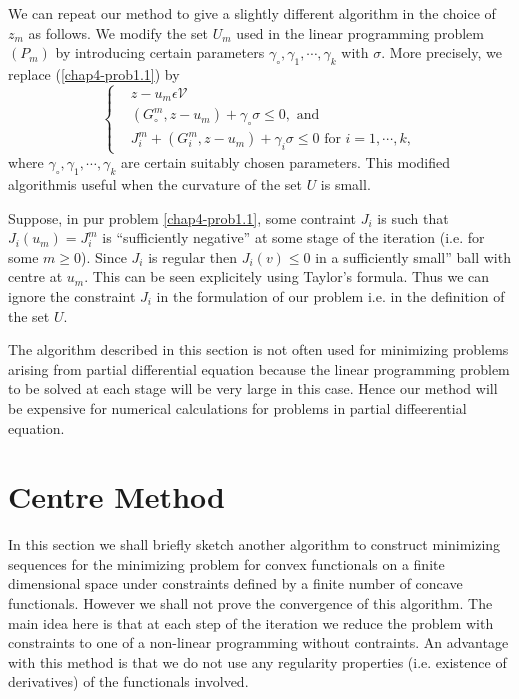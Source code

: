 \begin{remark}\label{chap4-rem1.3}
We can repeat our method to give a slightly different algorithm in the choice of $z_{m}$ as follows. We modify the set $U_{m}$ used in the linear programming problem $(P_{m})$ by introducing certain parameters $\gamma_{\circ}, \gamma_{1}, \cdots, \gamma_{k}$ with $\sigma$. More precisely, we replace (\ref{chap4-prob1.1}) by
\begin{equation*}
\begin{cases}
& z-u_{m} \epsilon \mathscr{V}\\
& (G_{\circ}^{m}, z-u_{m}) + \gamma_{\circ} \sigma \leq 0, \text{ and }\\
& J_{i}^{m} + (G_{i}^{m}, z-u_{m}) + \gamma_{i} \sigma \leq 0 \text{ for } i=1, \cdots , k,\tag*{$(1.1)'$}\label{chap4-eq1.1'}
\end{cases}
\end{equation*}
where $\gamma_{\circ}, \gamma_{1}, \cdots, \gamma_{k}$ are certain suitably chosen parameters. This modified algorithm\pageoriginale is useful when the curvature of the set $U$ is small.
\end{remark}

\begin{remark}\label{chap4-rem1.4}
  Suppose, in pur problem \ref{chap4-prob1.1}, some contraint $J_{i}$ is such that $J_{i}(u_{m}) = J_{i}^{m}$ is ``sufficiently negative'' at some stage of the iteration (i.e. for some $m \geq 0$). Since $J_{i}$ is regular then $J_{i}(v) \leq 0$ in a sufficiently small'' ball with centre at $u_{m}$. This can be seen explicitely using Taylor's formula. Thus we can ignore the constraint $J_{i}$ in the formulation of our problem i.e. in the definition of the set $U$.
\end{remark}

\begin{remark}\label{chap4-rem1.5}
The algorithm described in this section is not often used for minimizing problems arising from partial differential equation because the linear programming problem to be solved at each stage will be very large in this case. Hence our method will be expensive for numerical calculations for problems in partial diffeerential equation.
\end{remark}

\section{Centre Method}\label{chap4-sec2}
In this section we shall briefly sketch another algorithm to construct minimizing sequences for the minimizing problem for convex functionals on a finite dimensional space under constraints defined by a finite number of concave functionals. However we shall not prove the convergence of this algorithm. The main idea here is that at each step of the iteration we reduce the problem with constraints to one of a non-linear programming without contraints. An advantage with this method is that we do not use any regularity properties (i.e. existence of derivatives) of the functionals involved.

